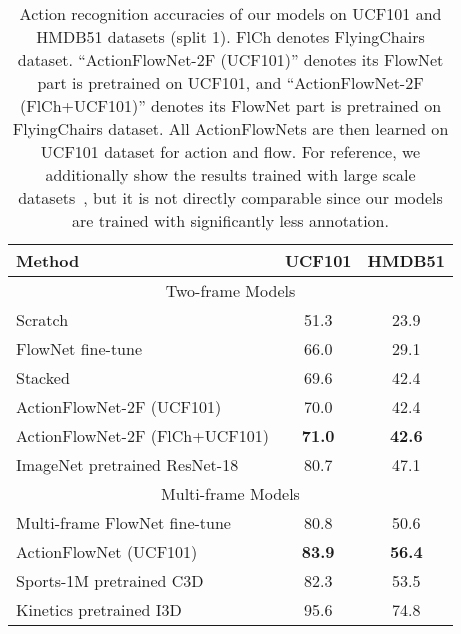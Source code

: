 \documentclass[10pt,twocolumn,letterpaper]{article}
\begin{document}
\begin{table}[h!]
\begin{center}
{\small
    \begin{tabular}{l|c|c}
    \hline
    Method & UCF101 & HMDB51\\
    \hline\hline
      \multicolumn{3}{c}{Two-frame Models} \\
      \hline
    Scratch & 51.3 & 23.9 \\
    FlowNet fine-tune & 66.0 & 29.1 \\
    \hline
    Stacked & 69.6 & 42.4  \\
    ActionFlowNet-2F (UCF101)         & 70.0 & 42.4 \\
    ActionFlowNet-2F (FlCh+UCF101)  & \textbf{71.0} & \textbf{42.6}  \\
    \hline
    ImageNet pretrained ResNet-18 & 80.7 & 47.1\\

    \hline \hline
      \multicolumn{3}{c}{Multi-frame Models} \\
      \hline
    Multi-frame FlowNet fine-tune  & 80.8 & 50.6 \\
    ActionFlowNet (UCF101) & \textbf{83.9} & \textbf{56.4} \\
      \hline
    Sports-1M pretrained C3D~\cite{tranBFTP15} & 82.3 & 53.5\\
    Kinetics pretrained I3D~\cite{carreira2017quo} & 95.6 & 74.8\\
    \hline
    \end{tabular}
}
\end{center}
  \vspace{-1em}
  \caption{Action recognition accuracies of our models on UCF101 and HMDB51 datasets (split 1). FlCh denotes FlyingChairs dataset. ``ActionFlowNet-2F (UCF101)'' denotes its FlowNet part is pretrained on UCF101, and ``ActionFlowNet-2F (FlCh+UCF101)'' denotes its FlowNet part is pretrained on FlyingChairs dataset. All ActionFlowNets are then learned on UCF101 dataset for action and flow. For reference, we additionally show the results trained with large scale datasets~\cite{tranbftp16,carreira2017quo}, but it is not directly comparable since our models are trained with significantly less annotation.}
\label{tab:results}
\end{table}
\end{document}
